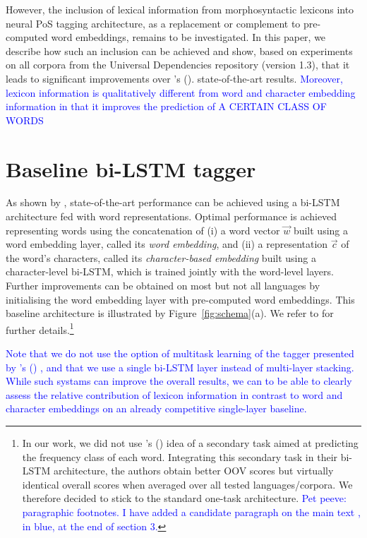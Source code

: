 \documentclass[11pt,letterpaper]{article}
\begin{document}
However, the inclusion of lexical information from morphosyntactic lexicons into neural PoS tagging architecture, as a
replacement or complement to pre-computed word embeddings, remains to be investigated. In this paper, we describe how
such an inclusion can be achieved and show, based on experiments on all corpora from the Universal Dependencies
repository (version 1.3), that it leads to significant improvements over \citeauthor{plank16}'s (\citeyear{plank16}).
state-of-the-art results. \textcolor{blue}{Moreover, lexicon information is qualitatively different from word and character embedding information in that it improves the prediction of A CERTAIN CLASS OF WORDS}

\section{Baseline bi-LSTM tagger}
\label{sec:baselinearchitecture}
As shown by \citet{plank16}, state-of-the-art performance can be achieved using a bi-LSTM architecture fed with word
representations. Optimal performance is achieved representing words using the concatenation of (i) a word vector
$\vec{w}$ built using a word embedding layer, called its {\em word embedding}, and (ii) a representation $\vec{c}$ of
the word's characters, called its {\em character-based embedding} built using a character-level bi-LSTM, which is
trained jointly with the word-level layers. Further improvements can be obtained on most but not all languages by
initialising the word embedding layer with pre-computed word embeddings. This baseline architecture is illustrated by
Figure~\ref{fig:schema}(a). We refer to \citet{plank16} for further details.\footnote{In our work, we did not use
  \citeauthor{plank16}'s (\citeyear{plank16}) idea of a secondary task aimed at predicting the frequency class of each
  word. Integrating this secondary task in their bi-LSTM architecture, the authors obtain better OOV scores but
  virtually identical overall scores when averaged over all tested languages/corpora. We therefore decided to stick to
  the standard one-task architecture. \textcolor{blue}{Pet peeve: paragraphic footnotes. I have added a candidate paragraph on the main text , in blue, at the end of section 3.}}

\textcolor{blue}{Note that we do not use the option of multitask learning of the tagger presented by \citeauthor{plank16}'s (\citeyear{plank16}) , and that we use a single bi-LSTM layer instead of multi-layer stacking. While  such systams can improve the overall results, we can to be able to clearly assess the relative contribution of lexicon information in contrast to word and character embeddings on an already competitive single-layer baseline.}
\end{document}
